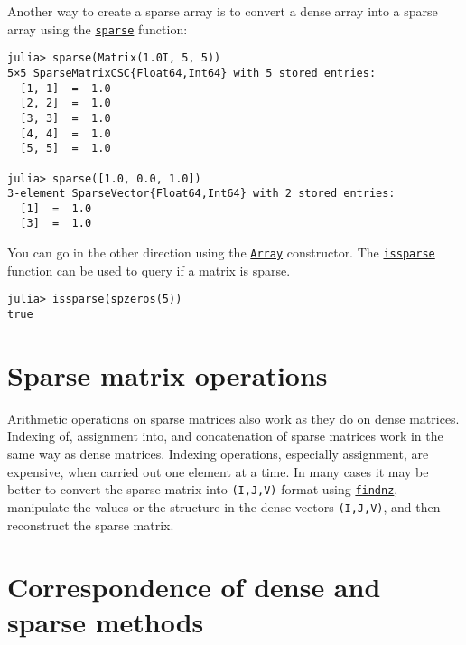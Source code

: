 Another way to create a sparse array is to convert a dense array into a sparse array using the \hyperlink{10167157011990389788}{\texttt{sparse}} function:




\begin{verbatim}
julia> sparse(Matrix(1.0I, 5, 5))
5×5 SparseMatrixCSC{Float64,Int64} with 5 stored entries:
  [1, 1]  =  1.0
  [2, 2]  =  1.0
  [3, 3]  =  1.0
  [4, 4]  =  1.0
  [5, 5]  =  1.0

julia> sparse([1.0, 0.0, 1.0])
3-element SparseVector{Float64,Int64} with 2 stored entries:
  [1]  =  1.0
  [3]  =  1.0
\end{verbatim}



You can go in the other direction using the \hyperlink{15492651498431872487}{\texttt{Array}} constructor. The \hyperlink{14062776301471954766}{\texttt{issparse}} function can be used to query if a matrix is sparse.




\begin{verbatim}
julia> issparse(spzeros(5))
true
\end{verbatim}



\hypertarget{11258027552614597251}{}


\section{Sparse matrix operations}



Arithmetic operations on sparse matrices also work as they do on dense matrices. Indexing of, assignment into, and concatenation of sparse matrices work in the same way as dense matrices. Indexing operations, especially assignment, are expensive, when carried out one element at a time. In many cases it may be better to convert the sparse matrix into \texttt{(I,J,V)} format using \hyperlink{15430174447643444721}{\texttt{findnz}}, manipulate the values or the structure in the dense vectors \texttt{(I,J,V)}, and then reconstruct the sparse matrix.



\hypertarget{3328350436064607795}{}


\section{Correspondence of dense and sparse methods}




